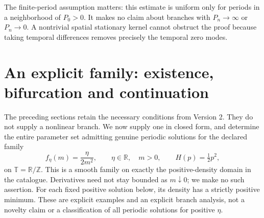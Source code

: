 \documentclass[11pt]{article}
\newcommand{\R}{\mathbb R}
\newcommand{\Z}{\mathbb Z}
\newcommand{\T}{\mathbb T}
\begin{document}
The finite-period assumption matters: this estimate is uniform only for
periods in a neighborhood of $P_0>0$. It makes no claim about branches
with $P_n\to\infty$ or $P_n\to0$. A nontrivial spatial stationary
kernel cannot obstruct the proof because taking temporal differences
removes precisely the temporal zero modes.

\section{An explicit family: existence, bifurcation and continuation}
The preceding sections retain the necessary conditions from Version 2.
They do not supply a nonlinear branch. We now supply one in closed form,
and determine the entire parameter set admitting genuine periodic
solutions for the declared family
\begin{equation}\label{inversefamily}
 f_\eta(m)=\frac{\eta}{2m^2},\qquad \eta\in\R,\quad m>0,
 \qquad H(p)=\tfrac12p^2,
\end{equation}
on $\T=\R/\Z$. This is a smooth family on exactly the positive-density
domain in the catalogue. Derivatives need not stay bounded as $m\downarrow0$;
we make no such assertion. For each fixed positive solution below, its
density has a strictly positive minimum. These are explicit examples and
an explicit branch analysis, not a novelty claim or a classification of
all periodic solutions for positive $\eta$.
\end{document}
